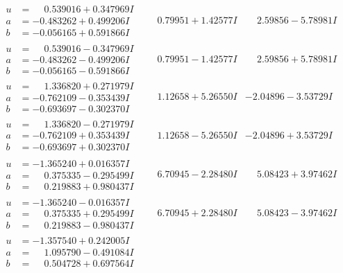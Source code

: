 \documentclass[1p]{elsarticle_modified}
\theoremstyle{definition}
\begin{document}
$$\begin{array}{c|c|c}
\begin{aligned}
u &= \phantom{-}0.539016 + 0.347969 I \\
a &= -0.483262 + 0.499206 I \\
b &= -0.056165 + 0.591866 I\end{aligned}
 & \phantom{-}0.79951 + 1.42577 I & \phantom{-}2.59856 - 5.78981 I \\ \hline\begin{aligned}
u &= \phantom{-}0.539016 - 0.347969 I \\
a &= -0.483262 - 0.499206 I \\
b &= -0.056165 - 0.591866 I\end{aligned}
 & \phantom{-}0.79951 - 1.42577 I & \phantom{-}2.59856 + 5.78981 I \\ \hline\begin{aligned}
u &= \phantom{-}1.336820 + 0.271979 I \\
a &= -0.762109 - 0.353439 I \\
b &= -0.693697 - 0.302370 I\end{aligned}
 & \phantom{-}1.12658 + 5.26550 I & -2.04896 - 3.53729 I \\ \hline\begin{aligned}
u &= \phantom{-}1.336820 - 0.271979 I \\
a &= -0.762109 + 0.353439 I \\
b &= -0.693697 + 0.302370 I\end{aligned}
 & \phantom{-}1.12658 - 5.26550 I & -2.04896 + 3.53729 I \\ \hline\begin{aligned}
u &= -1.365240 + 0.016357 I \\
a &= \phantom{-}0.375335 - 0.295499 I \\
b &= \phantom{-}0.219883 + 0.980437 I\end{aligned}
 & \phantom{-}6.70945 - 2.28480 I & \phantom{-}5.08423 + 3.97462 I \\ \hline\begin{aligned}
u &= -1.365240 - 0.016357 I \\
a &= \phantom{-}0.375335 + 0.295499 I \\
b &= \phantom{-}0.219883 - 0.980437 I\end{aligned}
 & \phantom{-}6.70945 + 2.28480 I & \phantom{-}5.08423 - 3.97462 I \\ \hline\begin{aligned}
u &= -1.357540 + 0.242005 I \\
a &= \phantom{-}1.095790 - 0.491084 I \\
b &= \phantom{-}0.504728 + 0.697564 I\end{aligned}

\end{array}$$
\end{document}
